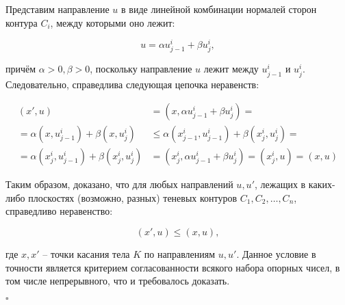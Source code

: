 \documentclass[a4paper, 10pt]{article}
\theoremstyle{definition}
\theoremstyle{plain}
\theoremstyle{plain}
\begin{document}
Представим направление $u$ в виде линейной комбинации нормалей сторон контура
$C_{i}$, между которыми оно лежит:

\begin{equation*}
 u = \alpha u^{i}_{j - 1} + \beta u^{i}_{j},
\end{equation*}

причём $\alpha > 0, \beta > 0$, поскольку направление $u$ лежит между
$u^{i}_{j - 1}$ и $u^{i}_{j}$. Следовательно, справедлива следующая цепочка
неравенств:

\begin{align*}
 (x', u) &= (x, \alpha u^{i}_{j - 1} + \beta u^{i}_{j}) = \\
 = \alpha (x, u^{i}_{j - 1}) + \beta (x, u^{i}_{j}) &\leq
 \alpha (x^{i}_{j - 1}, u^{i}_{j - 1}) + \beta (x^{i}_{j}, u^{i}_{j}) = \\
 = \alpha (x^{i}_{j}, u^{i}_{j - 1}) + \beta (x^{i}_{j}, u^{i}_{j}) &=
 (x^{i}_{j}, \alpha u^{i}_{j - 1} + \beta u^{i}_{j}) = (x^{i}_{j}, u) = (x, u)
\end{align*}

Таким образом, доказано, что для любых направлений $u, u'$, лежащих в каких-либо
плоскостях (возможно, разных) теневых контуров $C_{1}, C_{2}, \ldots, C_{n}$,
справедливо неравенство:

\begin{equation*}
 (x', u) \leq (x, u),
\end{equation*}

где $x, x'$ -- точки касания тела $K$ по направлениям $u, u'$. Данное условие
в точности является критерием согласованности всякого набора опорных чисел, в
том числе непрерывного, что и требовалось доказать.

$\square$
\end{document}
